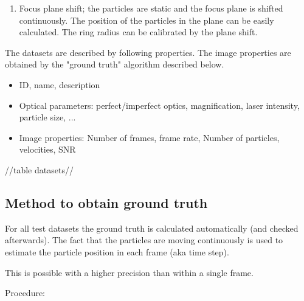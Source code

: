 \begin{enumerate}

    \item Focus plane shift; the particles are static and the focus plane is shifted continuously. The position of the particles in the plane can be easily calculated. The ring radius can be calibrated by the plane shift.

\end{enumerate}



The datasets are described by following properties. The image properties are obtained by the "ground truth" algorithm described below.

\begin{itemize}

    \item ID, name, description

    \item Optical parameters: perfect/imperfect optics, magnification, laser intensity, particle size, ...

    \item Image properties: Number of frames, frame rate, Number of particles, velocities, SNR

\end{itemize}



//table datasets//





\subsection{Method to obtain ground truth}

For all test datasets the ground truth is calculated automatically (and checked afterwards). The fact that the particles are moving continuously is used to estimate the particle position in each frame (aka time step). 

This is possible with a higher precision than within a single frame.



Procedure:

